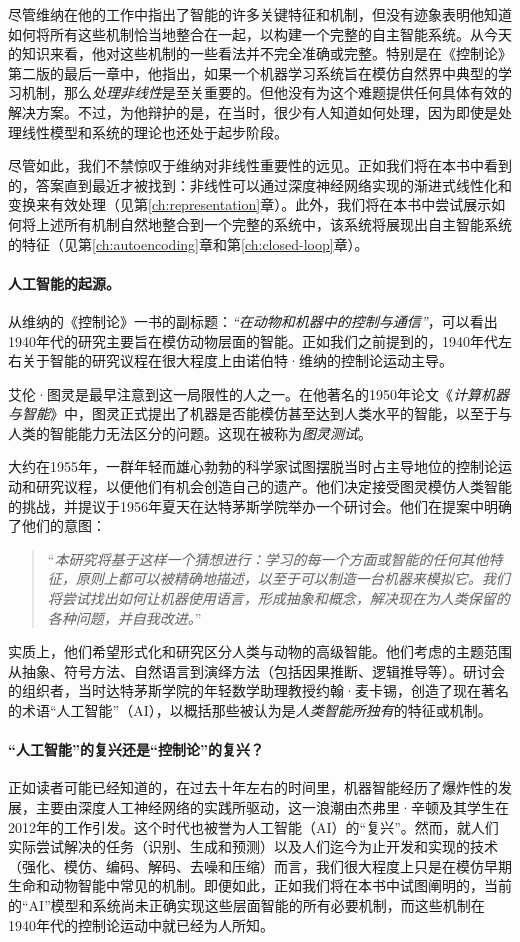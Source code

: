 \documentclass[../../book-main.tex]{subfiles}
\begin{document}
尽管维纳在他的工作中指出了智能的许多关键特征和机制，但没有迹象表明他知道如何将所有这些机制恰当地整合在一起，以构建一个完整的自主智能系统。从今天的知识来看，他对这些机制的一些看法并不完全准确或完整。特别是在《控制论》第二版的最后一章\cite{Wiener-Cybernetics-1961}中，他指出，如果一个机器学习系统旨在模仿自然界中典型的学习机制，那么{\em 处理非线性}是至关重要的。但他没有为这个难题提供任何具体有效的解决方案。不过，为他辩护的是，在当时，很少有人知道如何处理，因为即使是处理线性模型和系统的理论也还处于起步阶段。

尽管如此，我们不禁惊叹于维纳对非线性重要性的远见。正如我们将在本书中看到的，答案直到最近才被找到：非线性可以通过深度神经网络实现的渐进式线性化和变换来有效处理（见第\ref{ch:representation}章）。此外，我们将在本书中尝试展示如何将上述所有机制自然地整合到一个完整的系统中，该系统将展现出自主智能系统的特征（见第\ref{ch:autoencoding}章和第\ref{ch:closed-loop}章）。

\paragraph{人工智能的起源。}
从维纳的《控制论》一书的副标题：{\em “在动物和机器中的控制与通信”}，可以看出1940年代的研究主要旨在模仿动物层面的智能。正如我们之前提到的，1940年代左右关于智能的研究议程在很大程度上由诺伯特·维纳的控制论运动主导。

艾伦·图灵是最早注意到这一局限性的人之一。在他著名的1950年论文《{\em 计算机器与智能}》\cite{Turing-1950}中，图灵正式提出了机器是否能模仿甚至达到人类水平的智能，以至于与人类的智能能力无法区分的问题。这现在被称为{\em 图灵测试}。

大约在1955年，一群年轻而雄心勃勃的科学家试图摆脱当时占主导地位的控制论运动和研究议程，以便他们有机会创造自己的遗产。他们决定接受图灵模仿人类智能的挑战，并提议于1956年夏天在达特茅斯学院举办一个研讨会。他们在提案中明确了他们的意图：
\begin{quote}
    “{\em 本研究将基于这样一个猜想进行：学习的每一个方面或智能的任何其他特征，原则上都可以被精确地描述，以至于可以制造一台机器来模拟它。我们将尝试找出如何让机器使用语言，形成抽象和概念，解决现在为人类保留的各种问题，并自我改进。}”
\end{quote}
实质上，他们希望形式化和研究区分人类与动物的高级智能。他们考虑的主题范围从抽象、符号方法、自然语言到演绎方法（包括因果推断、逻辑推导等）。研讨会的组织者，当时达特茅斯学院的年轻数学助理教授约翰·麦卡锡，创造了现在著名的术语“人工智能”（AI），以概括那些被认为是{\em 人类智能所独有}的特征或机制。

\paragraph{“人工智能”的复兴还是“控制论”的复兴？}
正如读者可能已经知道的，在过去十年左右的时间里，机器智能经历了爆炸性的发展，主要由深度人工神经网络的实践所驱动，这一浪潮由杰弗里·辛顿及其学生在2012年的工作\cite{krizhevsky2012imagenet}引发。这个时代也被誉为人工智能（AI）的“复兴”。然而，就人们实际尝试解决的任务（识别、生成和预测）以及人们迄今为止开发和实现的技术（强化、模仿、编码、解码、去噪和压缩）而言，我们很大程度上只是在模仿早期生命和动物智能中常见的机制。即便如此，正如我们将在本书中试图阐明的，当前的“AI”模型和系统尚未正确实现这些层面智能的所有必要机制，而这些机制在1940年代的控制论运动中就已经为人所知。
\end{document}
